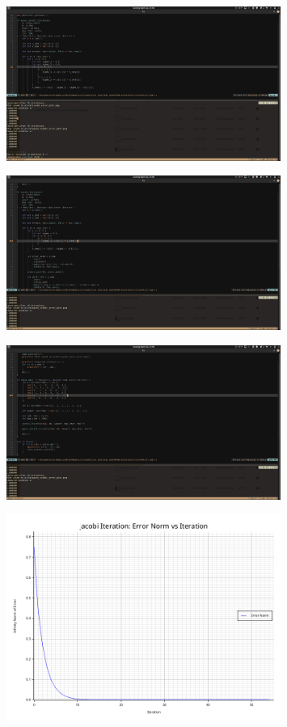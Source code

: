 \documentclass[12pt, letterpaper]{article}
\theoremstyle{nonumberplain}
\begin{document}
\begin{figure}[!htbp]
	\centering
	\includegraphics[width=0.8\textwidth]{numhw4q6-1.png}
\end{figure}
\begin{figure}[!htbp]
	\centering
	\includegraphics[width=0.8\textwidth]{numhw4q6-2.png}
\end{figure}
\begin{figure}[!htbp]
	\centering
	\includegraphics[width=0.8\textwidth]{numhw4q6-3.png}
\end{figure}
\begin{figure}[!htbp]
	\centering
	\includegraphics[width=0.8\textwidth]{jacobi_error_plot.png}
\end{figure}
\end{document}
